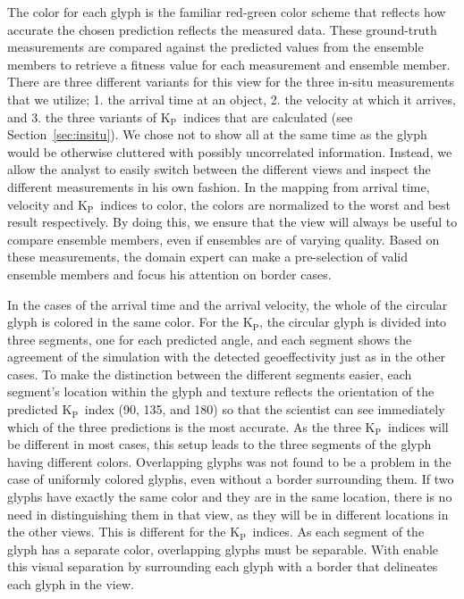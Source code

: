 \documentclass[journal]{vgtc}                %
\newcommand{\kpIndex}{$\textrm{K}_\textrm{P}$}
\begin{document}
The color for each glyph is the familiar red-green color scheme that reflects how accurate the chosen prediction reflects the measured data. These ground-truth measurements are compared against the predicted values from the ensemble members to retrieve a fitness value for each measurement and ensemble member. There are three different variants for this view for the three in-situ measurements that we utilize; 1. the arrival time at an object, 2. the velocity at which it arrives, and 3. the three variants of \kpIndex\ indices that are calculated (see Section~\ref{sec:insitu}). We chose not to show all at the same time as the glyph would be otherwise cluttered with possibly uncorrelated information. Instead, we allow the analyst to easily switch between the different views and inspect the different measurements in his own fashion. In the mapping from arrival time, velocity and \kpIndex\ indices to color, the colors are normalized to the worst and best result respectively. By doing this, we ensure that the view will always be useful to compare ensemble members, even if ensembles are of varying quality. Based on these measurements, the domain expert can make a pre-selection of valid ensemble members and focus his attention on border cases.

In the cases of the arrival time and the arrival velocity, the whole of the circular glyph is colored in the same color. For the \kpIndex , the circular glyph is divided into three segments, one for each predicted angle, and each segment shows the agreement of the simulation with the detected geoeffectivity just as in the other cases. To make the distinction between the different segments easier, each segment's location within the glyph and texture reflects the orientation of the predicted \kpIndex\ index (90\degree , 135\degree , and 180\degree ) so that the scientist can see immediately which of the three predictions is the most accurate. As the three \kpIndex\ indices will be different in most cases, this setup leads to the three segments of the glyph having different colors. Overlapping glyphs was not found to be a problem in the case of uniformly colored glyphs, even without a border surrounding them. If two glyphs have exactly the same color and they are in the same location, there is no need in distinguishing them in that view, as they will be in different locations in the other views. This is different for the \kpIndex\ indices. As each segment of the glyph has a separate color, overlapping glyphs must be separable. With enable this visual separation by surrounding each glyph with a border that delineates each glyph in the view.
\end{document}
